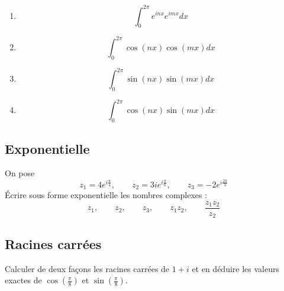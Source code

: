 \begin{enumerate}
    \item $$\int_0^{2\pi} e^{i n x} e^{i m x} dx$$
    \item $$\int_0^{2\pi} \cos(n x) \cos(m x) dx$$
    \item $$\int_0^{2\pi} \sin(n x) \sin(m x) dx$$
    \item $$\int_0^{2\pi} \cos(n x) \sin(m x) dx$$
\end{enumerate}



\vspace{2em}

\subsection{Exponentielle}
On pose 
$$z_1=4 e^{i \frac{\pi}{4}}, \qquad z_2=3 i e^{i \frac{\pi}{6}}, \qquad z_3=-2 e^{i \frac{2 \pi}{3}}$$
Écrire sous forme exponentielle les nombres complexes : 
$$z_1,\qquad z_2,\qquad z_3 , \qquad z_1 z_2, \qquad \frac{z_1 z_2}{z_2}$$



\vspace{2em}

\subsection{Racines carrées}
Calculer de deux façons les racines carrées de $1+i$ et en déduire les valeurs exactes de $\cos \left(\frac{\pi}{8}\right)$ et $\sin \left(\frac{\pi}{8}\right)$.